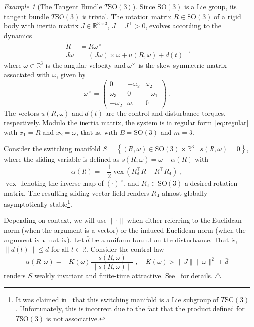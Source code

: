 \documentclass{article}
\theoremstyle{definition}
\theoremstyle{remark}
\newtheorem{example}{Example}
\newcommand\xqed[1]{%
  \leavevmode\unskip\penalty9999 \hbox{}\nobreak\hfill
  \quad\hbox{#1}}
\newcommand\eexa{\xqed{$\triangle$}}
\newcommand{\RR}{\mathbb{R}}	%
\newcommand{\rd}{\mathrm{d}}	%
\newcommand{\SO}{\mathrm{SO}} %
\newcommand{\SW}{S}	%
\DeclareMathOperator{\vex}{vex}
\begin{document}
\begin{example}[The Tangent Bundle $T\SO(3)$] \label{exa:TSO3}
 Since $\SO(3)$ is a Lie group, its tangent bundle $T\SO(3)$ is trivial. The rotation matrix $R \in \SO(3)$ of a rigid body with 
 inertia matrix $J \in \RR^{3\times 3}$, $J = J^\top > 0$, evolves according to the dynamics~\cite{murray}
 \begin{displaymath}
 \begin{aligned}
        \dot{R} &= R \omega^\times \\
  J\dot{\omega} &= (J\omega) \times \omega + u(R,\omega) + d(t) 
 \end{aligned} \;,
 \end{displaymath}
 where $\omega \in \RR^3$ is the angular velocity and $\omega^\times$ is the skew-symmetric matrix associated with $\omega$, given by
 \begin{displaymath}
  \omega^\times =
   \begin{pmatrix}
            0 & -\omega_3 & \omega_2 \\
     \omega_3 & 0         & -\omega_1 \\
    -\omega_2 & \omega_1  & 0
   \end{pmatrix} \;.
 \end{displaymath}
 The vectors $u(R,\omega)$ and $d(t)$ are the control and disturbance torques, respectively. Modulo the inertia matrix, the system is in
 regular form~\eqref{eq:regular} with $x_1 = R$ and $x_2 = \omega$, that is, with $B = \SO(3)$ and $m=3$.

 Consider the switching manifold $\SW = \left\{ (R,\omega) \in \SO(3)\times\RR^3 \mid s(R,\omega) = 0 \right\}$,
 where the sliding variable is defined as $s(R,\omega) = \omega - \alpha(R)$ with~\cite{gomez2019b}
 \begin{displaymath}
  \alpha(R) = -\frac{1}{2}\vex(R_\rd^\top R - R^\top R_\rd ) \;,
 \end{displaymath}
 $\vex$ denoting the inverse map of $(\cdot)^\times$, and $R_\rd \in \SO(3)$ a desired rotation matrix. The resulting sliding vector field
 renders $R_\rd$ almost globally asymptotically stable\footnote{It was claimed in~\cite{gomez2019}
 that this switching manifold is a Lie subgroup of $T\SO(3)$. Unfortunately, this is incorrect due to the fact that the 
 product defined for $T\SO(3)$ is not associative.}.

Depending on context, we will use $\|\cdot\|$ when either referring to the Euclidean norm (when the argument is a vector)
 or the induced Euclidean norm (when the argument is a matrix).
 Let $\bar{d}$ be a uniform bound on the disturbance. That is, $\|d(t)\| \le \bar{d}$ for all $t \in \RR$. Consider the control law
 \begin{displaymath}
  u(R,\omega) = -K(\omega)\frac{s(R,\omega)}{\| s(R,\omega) \|} \;, \quad K(\omega) > \|J\|\|\omega\|^2 + \bar{d}
 \end{displaymath}
 renders $\SW$ weakly invariant and finite-time attractive.  See~\cite{gomez2019b} for details. \eexa
\end{example}
\end{document}
